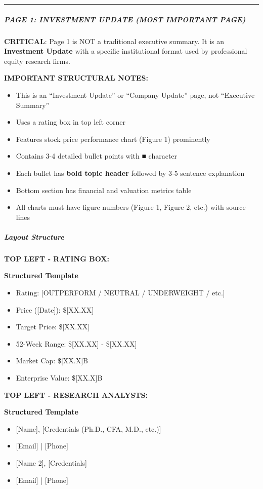\documentclass[11pt]{article}
\begin{document}
\vspace{0.5em}\hrule\vspace{0.5em}

\subparagraph{PAGE 1: INVESTMENT UPDATE (MOST IMPORTANT PAGE)}\mbox{}\par

\textbf{CRITICAL}: Page 1 is NOT a traditional executive summary. It is an \textbf{Investment Update} with a specific institutional format used by professional equity research firms.


\textbf{IMPORTANT STRUCTURAL NOTES:}

\begin{itemize}[leftmargin=*,itemsep=2pt,topsep=2pt]
\item {} This is an ``Investment Update'' or ``Company Update'' page, not ``Executive Summary''
\item {} Uses a rating box in top left corner
\item {} Features stock price performance chart (Figure 1) prominently
\item {} Contains 3-4 detailed bullet points with ■ character
\item {} Each bullet has \textbf{bold topic header} followed by 3-5 sentence explanation
\item {} Bottom section has financial and valuation metrics table
\item {} All charts must have figure numbers (Figure 1, Figure 2, etc.) with source lines
\end{itemize}

\subparagraph{Layout Structure}\mbox{}\par

\textbf{TOP LEFT - RATING BOX:}

\textbf{Structured Template}
\begin{itemize}[leftmargin=*,itemsep=2pt,topsep=2pt]
\item {} Rating: [OUTPERFORM / NEUTRAL / UNDERWEIGHT / etc.]
\item {} Price ([Date]): \$[XX.XX]
\item {} Target Price: \$[XX.XX]
\item {} 52-Week Range: \$[XX.XX] - \$[XX.XX]
\item {} Market Cap: \$[XX.X]B
\item {} Enterprise Value: \$[XX.X]B
\end{itemize}

\textbf{TOP LEFT - RESEARCH ANALYSTS:}

\textbf{Structured Template}
\begin{itemize}[leftmargin=*,itemsep=2pt,topsep=2pt]
\item {} [Name], [Credentials (Ph.D., CFA, M.D., etc.)]
\item {} [Email] | [Phone]
\item {} [Name 2], [Credentials]
\item {} [Email] | [Phone]
\end{itemize}
\end{document}
